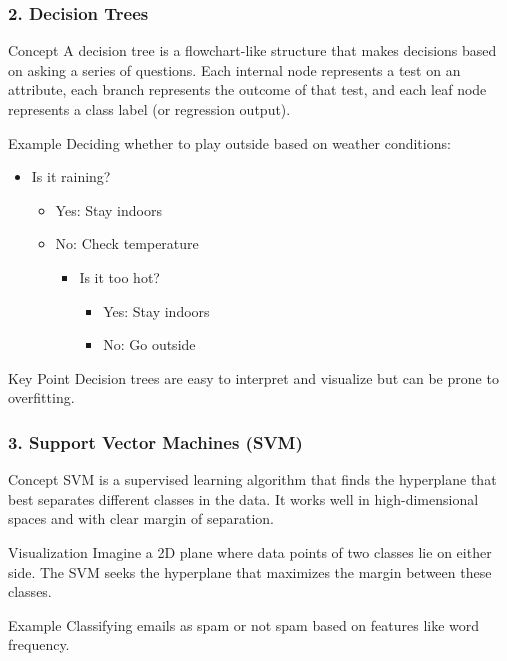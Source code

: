 \documentclass{beamer}
\begin{document}
\begin{frame}[fragile]
    \frametitle{2. Decision Trees}
    \begin{block}{Concept}
        A decision tree is a flowchart-like structure that makes decisions based on asking a series of questions. Each internal node represents a test on an attribute, each branch represents the outcome of that test, and each leaf node represents a class label (or regression output).
    \end{block}

    \begin{block}{Example}
        Deciding whether to play outside based on weather conditions:
        \begin{itemize}
            \item Is it raining?
            \begin{itemize}
                \item Yes: Stay indoors
                \item No: Check temperature
                \begin{itemize}
                    \item Is it too hot?
                    \begin{itemize}
                        \item Yes: Stay indoors
                        \item No: Go outside
                    \end{itemize}
                \end{itemize}
            \end{itemize}
        \end{itemize}
    \end{block}

    \begin{block}{Key Point}
        Decision trees are easy to interpret and visualize but can be prone to overfitting.
    \end{block}
\end{frame}

\begin{frame}[fragile]
    \frametitle{3. Support Vector Machines (SVM)}
    \begin{block}{Concept}
        SVM is a supervised learning algorithm that finds the hyperplane that best separates different classes in the data. It works well in high-dimensional spaces and with clear margin of separation.
    \end{block}

    \begin{block}{Visualization}
        Imagine a 2D plane where data points of two classes lie on either side. The SVM seeks the hyperplane that maximizes the margin between these classes.
    \end{block}

    \begin{block}{Example}
        Classifying emails as spam or not spam based on features like word frequency.
    \end{block}
\end{frame}
\end{document}
